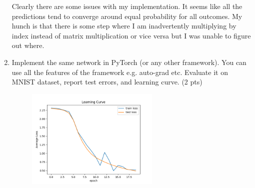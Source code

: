 \documentclass[a4paper]{article}
\theoremstyle{definition}
\newenvironment{soln}{
    \leavevmode\color{blue}\ignorespaces
}{}
\begin{document}
\begin{enumerate}
\begin{soln}
        Clearly there are some issues with my implementation.
        It seems like all the predictions tend to converge around equal probability for all outcomes.
        My hunch is that there is some step where I am inadvertently multiplying by index instead of matrix multiplication or vice versa but I was unable to figure out where.
    \end{soln}

    \item Implement the same network in PyTorch (or any other framework). You can use all the features of the framework e.g. auto-grad etc. Evaluate it on MNIST dataset, report test errors, and learning curve. (2 pts)
    
    \begin{soln}
        \begin{figure}[H]
			\centering
			\includegraphics[width=0.6\textwidth]{../figs/pytorch_learning_curve.png}
		\end{figure}
       

\end{soln}
\end{enumerate}
\end{document}
